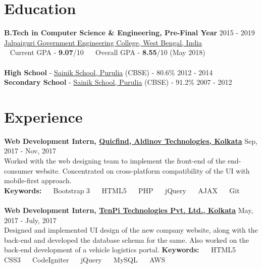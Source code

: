 \documentclass[margin, centered]{res}
\begin{document}
\begin{resume}

\section{Education}
\textbf{B.Tech in Computer Science \& Engineering, Pre-Final Year} \hfill 2015 - 2019 \\
\href{http://jgec.ac.in/}{Jalpaiguri Government Engineering College, West Bengal, India} \\
\hspace*{0.6em}\textbullet~ Current GPA - \textbf{9.07}/10 ~\textbullet~ Overall GPA - \textbf{8.55}/10 (May 2018)
\\
\\
\textbf{High School} - \href{http://sainikschoolpurulia.com/}{Sainik School, Purulia} (CBSE) - 80.6\% \hfill 2012 - 2014 \\
\textbf{Secondary School} - \href{http://sainikschoolpurulia.com/}{Sainik School, Purulia} (CBSE) - 91.2\% \hfill 2007 - 2012
 
\section{Experience}
\textbf{Web Development Intern, \href{http://www.quicfind.com}{Quicfind, Aldinov Technologies, Kolkata}} \hfill Sep, 2017 - Nov, 2017\\
Worked with the web designing team to implement the front-end of the end-consumer website. Concentrated on cross-platform compatibility of the UI with mobile-first approach.\\
\textbf{Keywords:} ~\textbullet~ Bootstrap 3 ~\textbullet~ HTML5 ~\textbullet~ PHP ~\textbullet~ jQuery ~\textbullet~ AJAX ~\textbullet~ Git\\
\\
\textbf{Web Development Intern, \href{http://www.tenpitech.com/}{TenPi Technologies Pvt. Ltd., Kolkata}} \hfill May, 2017 - July, 2017\\
Designed and implemented UI design of the new company website, along with the back-end and developed the database schema for the same. Also worked on the back-end development of a vehicle logistics portal.
\textbf{Keywords:} ~\textbullet~ HTML5 ~\textbullet~ CSS3 ~\textbullet~ CodeIgniter ~\textbullet~ jQuery ~\textbullet~ MySQL ~\textbullet~ AWS

\end{resume}
\end{document}
